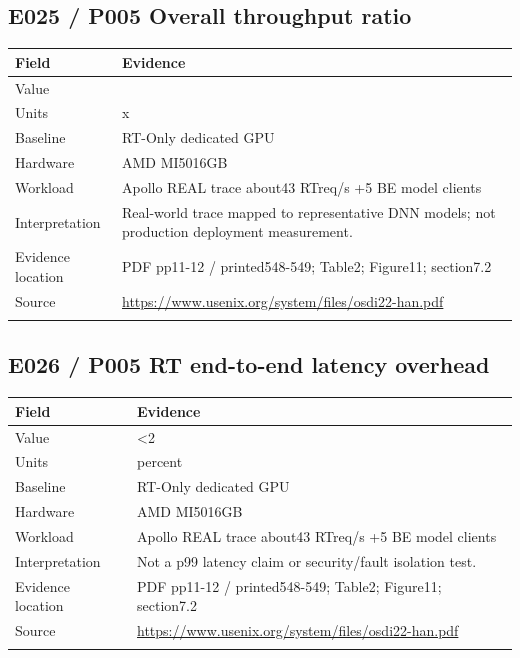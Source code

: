 \subsection*{E025 / P005 Overall throughput ratio}

\begin{longtable}{>{\raggedright\arraybackslash}p{}>{\raggedright\arraybackslash}p{}}
\toprule
\textbf{Field} & \textbf{Evidence}\\\midrule\endhead
Value & 7.7\\\addlinespace
Units & x\\\addlinespace
Baseline & RT-Only dedicated GPU\\\addlinespace
Hardware & AMD MI5016GB\\\addlinespace
Workload & Apollo REAL trace about43 RTreq/s +5 BE model clients\\\addlinespace
Interpretation & Real-world trace mapped to representative DNN models; not production deployment measurement.\\\addlinespace
Evidence location & PDF pp11-12 / printed548-549; Table2; Figure11; section7.2\\\addlinespace
Source & \url{https://www.usenix.org/system/files/osdi22-han.pdf}\\\addlinespace
\bottomrule\end{longtable}

\subsection*{E026 / P005 RT end-to-end latency overhead}

\begin{longtable}{>{\raggedright\arraybackslash}p{}>{\raggedright\arraybackslash}p{}}
\toprule
\textbf{Field} & \textbf{Evidence}\\\midrule\endhead
Value & <2\\\addlinespace
Units & percent\\\addlinespace
Baseline & RT-Only dedicated GPU\\\addlinespace
Hardware & AMD MI5016GB\\\addlinespace
Workload & Apollo REAL trace about43 RTreq/s +5 BE model clients\\\addlinespace
Interpretation & Not a p99 latency claim or security/fault isolation test.\\\addlinespace
Evidence location & PDF pp11-12 / printed548-549; Table2; Figure11; section7.2\\\addlinespace
Source & \url{https://www.usenix.org/system/files/osdi22-han.pdf}\\\addlinespace
\bottomrule\end{longtable}

